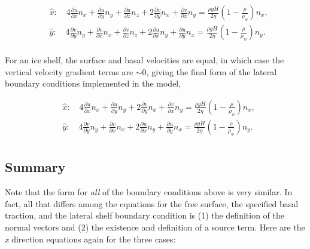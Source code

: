 \begin{equation}
\begin{split}
  & \hat{x}:\quad 4\frac{\partial u}{\partial x}n_{x}+\frac{\partial u}{\partial y}n_{y}+\frac{\partial u}{\partial z}n_{z}+2\frac{\partial v}{\partial y}n_{x}+\frac{\partial v}{\partial x}n_{y}=\frac{\rho gH}{2\eta }\left( 1-\frac{\rho }{\rho _{w}} \right)n_{x}, \\ 
 & \hat{y}:\quad 4\frac{\partial v}{\partial y}n_{y}+\frac{\partial v}{\partial x}n_{x}+\frac{\partial v}{\partial z}n_{z}+2\frac{\partial u}{\partial x}n_{y}+\frac{\partial u}{\partial y}n_{x}=\frac{\rho gH}{2\eta }\left( 1-\frac{\rho }{\rho _{w}} \right)n_{y}. \\ 
\end{split}
\end{equation}

For an ice shelf, the surface and basal velocities are equal, in which case the vertical velocity gradient terms are $\sim{0}$, giving the final form of the lateral boundary conditions implemented in the model,

\begin{equation}
\begin{split}
  & \hat{x}:\quad 4\frac{\partial u}{\partial x}n_{x}+\frac{\partial u}{\partial y}n_{y}+2\frac{\partial v}{\partial y}n_{x}+\frac{\partial v}{\partial x}n_{y}=\frac{\rho gH}{2\eta }\left( 1-\frac{\rho }{\rho _{w}} \right)n_{x}, \\ 
 & \hat{y}:\quad 4\frac{\partial v}{\partial y}n_{y}+\frac{\partial v}{\partial x}n_{x}+2\frac{\partial u}{\partial x}n_{y}+\frac{\partial u}{\partial y}n_{x}=\frac{\rho gH}{2\eta }\left( 1-\frac{\rho }{\rho _{w}} \right)n_{y}. \\ 
\end{split}
\end{equation}

\subsection{Summary}
Note that the form for \textit{all} of the boundary conditions above is very similar. In fact, all that differs among the equations for the free surface, the specified basal traction, and the lateral shelf boundary condition is (1) the definition of the normal vectors and (2) the existence and definition of a source term. Here are the \textit{x} direction equations again for the three cases:

